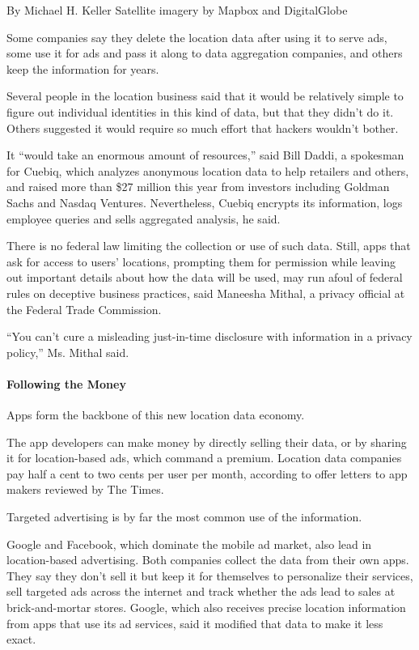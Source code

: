 By Michael H. Keller \textbar{} Satellite imagery by Mapbox and
DigitalGlobe

Some companies say they delete the location data after using it to serve
ads, some use it for ads and pass it along to data aggregation
companies, and others keep the information for years.

Several people in the location business said that it would be relatively
simple to figure out individual identities in this kind of data, but
that they didn't do it. Others suggested it would require so much effort
that hackers wouldn't bother.

It ``would take an enormous amount of resources,'' said Bill Daddi, a
spokesman for Cuebiq, which analyzes anonymous location data to help
retailers and others, and raised more than \$27 million this year from
investors including Goldman Sachs and Nasdaq Ventures. Nevertheless,
Cuebiq encrypts its information, logs employee queries and sells
aggregated analysis, he said.

There is no federal law limiting the collection or use of such data.
Still, apps that ask for access to users' locations, prompting them for
permission while leaving out important details about how the data will
be used, may run afoul of federal rules on deceptive business practices,
said Maneesha Mithal, a privacy official at the Federal Trade
Commission.

``You can't cure a misleading just-in-time disclosure with information
in a privacy policy,'' Ms. Mithal said.

\hypertarget{following-the-money}{%
\paragraph{Following the Money}\label{following-the-money}}

Apps form the backbone of this new location data economy.

The app developers can make money by directly selling their data, or by
sharing it for location-based ads, which command a premium. Location
data companies pay half a cent to two cents per user per month,
according to offer letters to app makers reviewed by The Times.

Targeted advertising is by far the most common use of the information.

Google and Facebook, which dominate the mobile ad market, also lead in
location-based advertising. Both companies collect the data from their
own apps. They say they don't sell it but keep it for themselves to
personalize their services, sell targeted ads across the internet and
track whether the ads lead to sales at brick-and-mortar stores. Google,
which also receives precise location information from apps that use its
ad services, said it modified that data to make it less exact.

